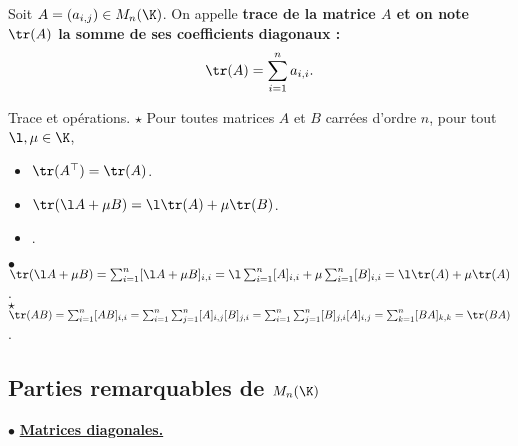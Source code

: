 \documentclass[11pt]{article}
\begin{document}
\begin{defi}{}{}
    Soit $A=(a_{i,j})\in M_n(\K)$. On appelle \bf{trace} de la matrice $A$ et on note $\tr(A)$ la somme de ses coefficients diagonaux :
    \begin{equation*}
        \tr(A)=\sum_{i=1}^na_{i,i}.
    \end{equation*}
\end{defi}

\begin{prop}{Trace et opérations. $\star$}{}
    Pour toutes matrices $A$ et $B$ carrées d'ordre $n$, pour tout $\l,\mu \in \K$,
    \begin{itemize}
        \item $\tr(A^\top)=\tr(A)$.
        \item $\tr(\l A + \mu B)=\l\tr(A)+\mu\tr(B)$.
        \item {}.
    \end{itemize}
    \tcblower
    $\bullet$ $\tr(\l A + \mu B)=\sum_{i=1}^n[\l A + \mu B]_{i,i}=\l\sum_{i=1}^n[A]_{i,i}+\mu\sum_{i=1}^n[B]_{i,i}=\l\tr(A)+\mu\tr(A)$.\\
    $\star$ $\tr(AB)=\sum_{i=1}^n[AB]_{i,i}=\sum_{i=1}^n\sum_{j=1}^n[A]_{i,j}[B]_{j,i}=\sum_{i=1}^n\sum_{j=1}^n[B]_{j,i}[A]_{i,j}=\sum_{k=1}^n[BA]_{k,k}=\tr(BA)$.
\end{prop}

\subsection{Parties remarquables de \texorpdfstring{$M_n(\K)$}{Lg}}

$\bullet$ \underline{\bf{Matrices diagonales.}}
\end{document}
